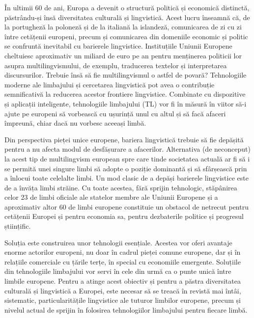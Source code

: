 \begin{multicols}{2}
În ultimii 60 de ani, Europa a devenit o structură politică și economică distinctă, păstrându-și însă diversitatea culturală și lingvistică. Acest lucru înseamnă că, de la portugheză la poloneză și de la italiană la islandeză, comunicarea de zi cu zi între cetățenii europeni, precum și comunicarea din domeniile economic și politic se confruntă inevitabil cu barierele lingvistice. Instituțiile Uniunii Europene cheltuiesc aproximativ un miliard de euro pe an pentru menținerea politicii lor asupra multilingvismului, de exemplu, traducerea textelor și interpretarea discursurilor. Trebuie însă să fie multilingvismul o astfel de povară? Tehnologiile moderne ale limbajului și cercetarea lingvistică pot avea o contribuție semnificativă la reducerea acestor frontiere lingvistice. Combinate cu dispozitive și aplicații inteligente, tehnologiile limbajului (TL) vor fi în măsură în viitor să-i ajute pe europeni să vorbească cu ușurință unul cu altul și să facă afaceri împreună, chiar dacă nu vorbesc aceeași limbă.


Din perspectiva pieței unice europene, bariera lingvistică trebuie să fie depășită pentru a nu afecta modul de desfășurare a afacerilor. Alternativa (de neconceput) la acest tip de multilingvism european spre care tinde societatea actuală ar fi să i se permită unei singure limbi să adopte o poziție dominantă și să sfârșească prin a înlocui toate celelalte limbi. Un mod clasic de a depăși barierele lingvistice este de a învăța limbi străine. Cu toate acestea, fără sprijin tehnologic, stăpânirea celor 23 de limbi oficiale ale statelor membre ale Uniunii Europene și a aproximativ altor 60 de limbi europene constituie un obstacol de netrecut pentru cetățenii Europei și pentru economia sa, pentru dezbaterile politice și progresul științific.

Soluția este construirea unor tehnologii esențiale. Acestea vor oferi avantaje enorme actorilor europeni, nu doar în cadrul pieței comune europene, dar și în relațiile comerciale cu țările terțe, în special cu economiile emergente. Soluțiile din tehnologiile limbajului vor servi în cele din urmă ca o punte unică între limbile europene. Pentru a atinge acest obiectiv și pentru a păstra diversitatea culturală și lingvistică a Europei, este necesar să se treacă în revistă mai întâi, sistematic, particularitățile lingvistice ale tuturor limbilor europene, precum și nivelul actual de sprijin în folosirea tehnologiilor limbajului pentru fiecare limbă. 


\end{multicols}
